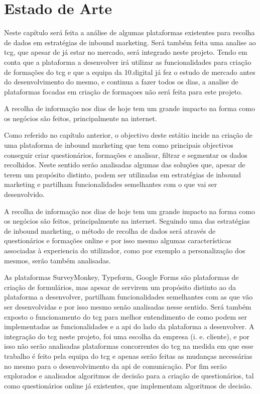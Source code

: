 \chapter{Estado de Arte}
\label{sec:estado-arte}

Neste capítulo será feita a análise de algumas plataformas existentes para recolha de dados em estratégias de inbound marketing. Será também feita uma analise ao \acrshort{tcg}, que apesar de já estar no mercado, será integrado neste projeto. Tendo em conta que a plataforma a desenvolver irá utilizar as funcionalidades para criação de formações do \acrshort{tcg} e que a equipa da 10.digital já fez o estudo de mercado antes do desenvolvimento do mesmo, e continua a fazer todos os dias, a analise de plataformas focadas em criação de formaçoes não será feita para este projeto. 

A recolha de informação nos dias de hoje tem um grande impacto na forma como os negócios são feitos, principalmente na internet.

Como referido no capítulo anterior, o objectivo deste estátio incide na criação de uma plataforma de inbound marketing que tem como principais objectivos conseguir criar questionários, formações e analisar, filtrar e segmentar os dados recolhidos. Neste sentido serão analisadas algumas das soluções que, apesar de terem um propósito distinto, podem ser utilizadas em estratégias de inbound marketing e partilham funcionalidades semelhantes com o que vai ser desenvolvido. 

A recolha de informação nos dias de hoje tem um grande impacto na forma como os negócios são feitos, principalmente na internet. Seguindo uma das estratégias de inbound marketing, o método de recolha de dados será através de questionários e formações online e por isso mesmo algumas características associadas à experiencia do utilizador, como por exemplo a personalização dos mesmos, serão também analisadas.


As plataformas SurveyMonkey\cite{surveymonkey}, Typeform\cite{typeform}, Google Forms\cite{googleform} são plataformas de criação de formulários, mas apesar de servirem um propósito distinto ao da plataforma a desenvolver, partilham funcionalidades semelhantes com as que vão ser desenvolvidas e por isso mesmo senão analisadas nesse sentido. Será também exposto o funcionamento do \acrshort{tcg} para melhor entendimento de como podem ser implementadas as funcionalidades e a \acrshort{api} do lado da plataforma a desenvolver. A integração do \acrshort{tcg} neste projeto, foi uma escolha da empresa (i. e. cliente), e por isso não serão analisadas plataformas concorrentes do \acrshort{tcg} na medida em que esse trabalho é feito pela equipa do \acrshort{tcg} e apenas serão feitas as mudanças necessárias no mesmo para o desenvolvimento da \acrshort{api} de comunicação. Por fim serão explorados e analisados algoritmos de decisão para a criação de questionários, tal como questionários online já existentes, que implementam algoritmos de decisão.

